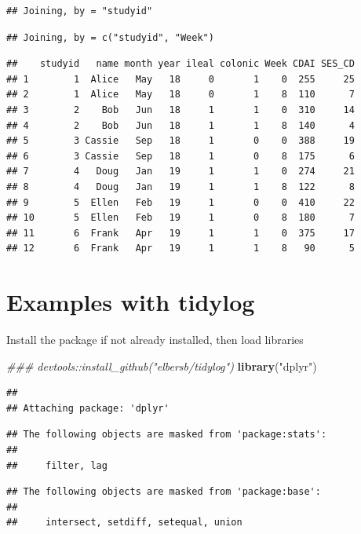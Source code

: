 \documentclass[
]{book}
\newenvironment{Shaded}{\begin{snugshade}}{\end{snugshade}}
\newcommand{\CommentTok}[1]{\textcolor[rgb]{0.56,0.35,0.01}{\textit{#1}}}
\newcommand{\KeywordTok}[1]{\textcolor[rgb]{0.13,0.29,0.53}{\textbf{#1}}}
\newcommand{\NormalTok}[1]{#1}
\newcommand{\StringTok}[1]{\textcolor[rgb]{0.31,0.60,0.02}{#1}}
\begin{document}
\begin{verbatim}
## Joining, by = "studyid"
\end{verbatim}

\begin{verbatim}
## Joining, by = c("studyid", "Week")
\end{verbatim}

\begin{verbatim}
##    studyid   name month year ileal colonic Week CDAI SES_CD
## 1        1  Alice   May   18     0       1    0  255     25
## 2        1  Alice   May   18     0       1    8  110      7
## 3        2    Bob   Jun   18     1       1    0  310     14
## 4        2    Bob   Jun   18     1       1    8  140      4
## 5        3 Cassie   Sep   18     1       0    0  388     19
## 6        3 Cassie   Sep   18     1       0    8  175      6
## 7        4   Doug   Jan   19     1       1    0  274     21
## 8        4   Doug   Jan   19     1       1    8  122      8
## 9        5  Ellen   Feb   19     1       0    0  410     22
## 10       5  Ellen   Feb   19     1       0    8  180      7
## 11       6  Frank   Apr   19     1       1    0  375     17
## 12       6  Frank   Apr   19     1       1    8   90      5
\end{verbatim}

\hypertarget{examples-with-tidylog}{%
\section{Examples with tidylog}\label{examples-with-tidylog}}

Install the package if not already installed,
then load libraries

\begin{Shaded}
\begin{Highlighting}[]
\CommentTok{### devtools::install_github("elbersb/tidylog")}
\KeywordTok{library}\NormalTok{(}\StringTok{"dplyr"}\NormalTok{)}
\end{Highlighting}
\end{Shaded}

\begin{verbatim}
## 
## Attaching package: 'dplyr'
\end{verbatim}

\begin{verbatim}
## The following objects are masked from 'package:stats':
## 
##     filter, lag
\end{verbatim}

\begin{verbatim}
## The following objects are masked from 'package:base':
## 
##     intersect, setdiff, setequal, union
\end{verbatim}
\end{document}
